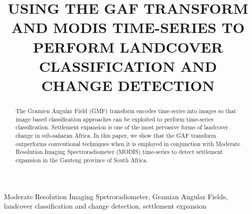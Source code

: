 \documentclass{article}
\title{USING THE GAF TRANSFORM AND MODIS TIME-SERIES TO PERFORM LANDCOVER CLASSIFICATION AND CHANGE DETECTION}
\begin{document}
%
\maketitle
%
\begin{abstract}
The Gramien Angular Field (GMF) transform encodes time-series into images so that image based classification approaches can be exploited to perform time-series classification. Settlement expansion is one of the most pervasive forms of landcover change in sub-saharan Africa. In this paper, we show that the GAF transform outperforms conventional techniques when it is employed in conjunction with Moderate Resolution Imaging Spectroradiometer (MODIS) time-series to detect settlement expansion in the Gauteng province of South Africa.   
\end{abstract}
%
\begin{keywords}
Moderate Resolution Imaging Spetroradiometer, Gramian Angular Fields, landcover classification and change detection, settlement expansion
\end{keywords}
%
\end{document}
